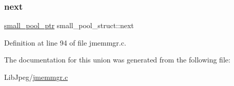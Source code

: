 \mbox{\label{unionsmall__pool__struct_a35adccff412d109347d363744d0bcd19}} 
\subsubsection{\texorpdfstring{next}{next}}
{\footnotesize\ttfamily \mbox{\hyperlink{jmemmgr_8c_a589d78516510f4b5a5d44e28debeab4d}{small\+\_\+pool\+\_\+ptr}} small\+\_\+pool\+\_\+struct\+::next}



Definition at line 94 of file jmemmgr.\+c.



The documentation for this union was generated from the following file\+:\begin{DoxyCompactItemize}
\item 
Lib\+Jpeg/\mbox{\hyperlink{jmemmgr_8c}{jmemmgr.\+c}}\end{DoxyCompactItemize}

